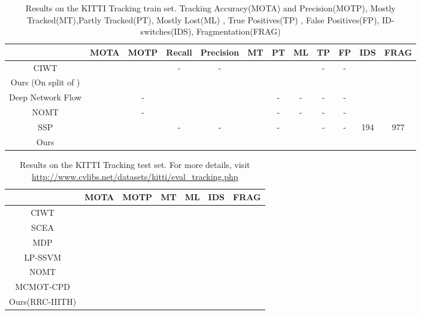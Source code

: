 \documentclass[letterpaper, 10 pt, conference]{ieeeconf}
\begin{document}
\begin{table*}[!hbt]
	\centering
    
    \caption{Results on the KITTI Tracking train set. Tracking Accuracy(MOTA) and Precision(MOTP), Mostly Tracked(MT),Partly Tracked(PT), Mostly Lost(ML) , True Positives(TP) , False Positives(FP), ID-switches(IDS), Fragmentation(FRAG) }
    
    \begin{adjustbox}{max width=\linewidth}    
	\begin{tabular}{|c|c|c|c|c|c|c|c|c|c|c|c|}
		\hline\hline
    	 &  MOTA & MOTP & Recall & Precision & MT & PT & ML & TP & FP & IDS & FRAG \\
      	\hline\hline
     	CIWT \cite{CIWT} &  &  & - & - &  &  &  & - & - &  &  \\
    	\hline
        Ours (On split of \cite{CIWT}) &  &  &  &  &  &  &  &  &  &  &  \\
    	\hline\hline
    	Deep Network Flow \cite{DeepNetworkFlow} &  & - &  &  &  & - & - & - & - &  &  \\
        \hline
        NOMT \cite{NOMT} &  & - &  &  &  & - & - & - & - &  &  \\
        \hline
        SSP \cite{followme} &  &  & - & - &  & - &  & - & - & 194 & 977 \\
    	\hline
    	Ours &  &  &  &  &  &  &  &  &  &  &  \\
    	\hline
        
	\end{tabular}
    \end{adjustbox}
    \label{table:overall}
\end{table*}

\begin{table*}[!hbt]
	\centering
    
    \caption{Results on the KITTI Tracking test set. For more details, visit \url{http://www.cvlibs.net/datasets/kitti/eval_tracking.php}}
    
    \begin{adjustbox}{max width=\linewidth}    
	\begin{tabular}{|c|c|c|c|c|c|c|}
		\hline\hline
    	 &  MOTA & MOTP & MT & ML & IDS & FRAG \\
      	\hline\hline
        CIWT \cite{CIWT} &  &  & &  &  &   \\
        \hline
        SCEA \cite{SCEA} &  &  & &  &  &   \\
        \hline
     	MDP \cite{MDPTracker} &  &  & &  &  &    \\
    	\hline
        LP-SSVM \cite{ijcv2017} &  &  & &  &  &   \\
        \hline
       NOMT \cite{NOMT} &  &  & &  &  &   \\
        \hline
       MCMOT-CPD \cite{eccv2016} &  &  & &  &  &   \\
    	\hline
    	Ours(RRC-IIITH) &  &  & &  &  &   \\
    	\hline
        
	\end{tabular}
    \end{adjustbox}
    \label{table:test}
\end{table*}
\end{document}
